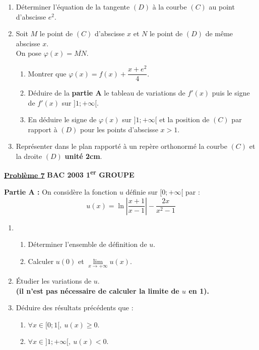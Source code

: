 \documentclass[12pt,a4paper]{article}
\newcommand{\exo}[1]{%
        \textbf{\underline{Problème #1}}
}
\begin{document}
\begin{multicols}{2}
\begin{enumerate}
    \item Déterminer l’équation de la tangente \( (D) \) à la courbe \( (C) \) au point d’abscisse \( e^2 \).
    \item Soit \( M \) le point de \( (C) \) d’abscisse \( x \) et \( N \) le point de \( (D) \) de même abscisse \( x \).\\
    On pose \( \varphi(x) = \overline{MN} \).
    \begin{enumerate}
        \item Montrer que \( \varphi(x) = f(x) + \dfrac{x + e^2}{4} \).
        \item Déduire de la \textbf{partie A} le tableau de variations de \( f'(x) \) puis le signe de \( f'(x) \) sur \( ]1 ; +\infty[ \).
        \item En déduire le signe de \( \varphi(x) \) sur \( ]1 ; +\infty[ \) et la position de \( (C) \) par rapport à \( (D) \) pour les points d’abscisse \( x > 1 \).
    \end{enumerate}

    \item Représenter dans le plan rapporté à un repère orthonormé la courbe \( (C) \) et la droite \( (D) \) \textbf{unité 2cm}.

\end{enumerate}

\exo{7} \textbf{BAC 2003 1\textsuperscript{er} GROUPE}

\textbf{Partie A :} On considère la fonction \( u \) définie sur \( [0 ; +\infty[ \) par :
\[
u(x) = \ln\left| \frac{x+1}{x-1} \right| - \frac{2x}{x^2 - 1}
\]

\begin{enumerate}
    \item 
    \begin{enumerate}
        \item Déterminer l’ensemble de définition de \( u \).
        \item Calculer \( u(0) \) et \( \lim\limits_{x \to +\infty} u(x) \).
    \end{enumerate}

    \item Étudier les variations de \( u \).\\
    \textbf{(il n’est pas nécessaire de calculer la limite de \( u \) en 1).}

    \item Déduire des résultats précédents que :
    \begin{enumerate}
        \item \( \forall x \in [0 ; 1[, \ u(x) \geq 0 \).
        \item \( \forall x \in ]1 ; +\infty[, \ u(x) < 0 \).
    \end{enumerate}
\end{enumerate}


\end{multicols}
\end{document}
